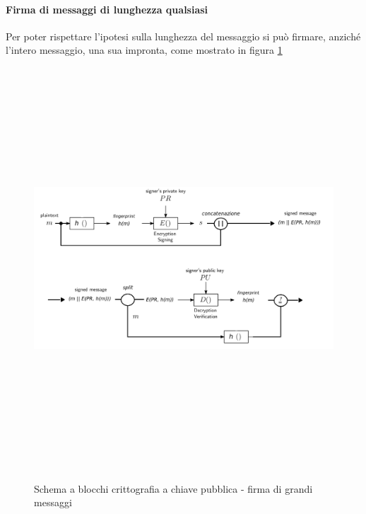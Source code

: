 \paragraph{Firma di messaggi di lunghezza qualsiasi}
Per poter rispettare l'ipotesi sulla lunghezza del messaggio si può firmare, anziché l'intero messaggio, una sua impronta, come mostrato in figura \ref{fig:pubblica_schema_firma_grandi}
\begin{figure}[htbp]
	\centering%
	\subfigure%
	{\includegraphics[height=15cm, width=15cm, keepaspectratio]{Immagini/chiave_pubblica/chiave_pubblica_firma_grandi.png}}
	\caption{Schema a blocchi crittografia a chiave pubblica - firma di grandi messaggi \label{fig:pubblica_schema_firma_grandi}} 	
\end{figure}

